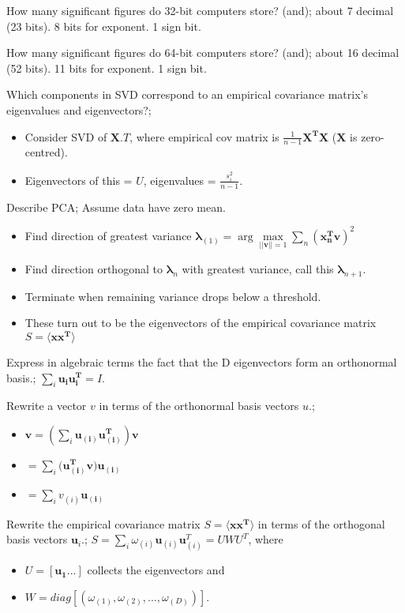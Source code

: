 \documentclass{article}
\begin{document}
How many significant figures do 32-bit computers store? (and); about 7 decimal (23 bits). 8 bits for exponent. 1 sign bit.

How many significant figures do 64-bit computers store? (and); about 16 decimal (52 bits). 11 bits for exponent. 1 sign bit.

Which components in SVD correspond to an empirical covariance matrix's eigenvalues and eigenvectors?; \begin{itemize} \item Consider SVD of $\mathbf{X}.T$, where empirical cov matrix is $\frac{1}{n-1}\mathbf{X^TX}$ ($\mathbf{X}$ is zero-centred). \item Eigenvectors of this = $U$, eigenvalues = $\frac{s_i^2}{n-1}$. \end{itemize}

Describe PCA; Assume data have zero mean. \begin{itemize} \item Find direction of greatest variance $\mathbf{\lambda}_{(1)}=\arg\max\limits_{||\mathbf{v}||=1}\sum_n(\mathbf{x^T_nv})^2$ \item Find direction orthogonal to $\mathbf{\lambda}_{n}$ with greatest variance, call this  $\mathbf{\lambda}_{n+1}$.  \item Terminate when remaining variance drops below a threshold.  \item These turn out to be the eigenvectors of the empirical covariance matrix $S=\langle \mathbf{xx^T} \rangle$ \end{itemize}

Express in algebraic terms the fact that the D eigenvectors form an orthonormal basis.; $\sum_i\mathbf{u_{i}u_{i}^T}=I$.

Rewrite a vector $v$ in terms of the orthonormal basis vectors $u$.; \begin{itemize} \item $\mathbf{v}=(\sum_i \mathbf{u_{(i)}u_{(i)}^T})\mathbf{v}$ \item $=\sum_i (\mathbf{u_{(i)}^Tv)u_{(i)}}$ \item $=\sum_i v_{(i)}\mathbf{u_{(i)}}$ \end{itemize}

Rewrite the empirical covariance matrix $S=\langle \mathbf{xx^T} \rangle$ in terms of the orthogonal basis vectors $\mathbf{u}_i$.; $S=\sum_i \omega_{(i)}\mathbf{u}_{(i)}\mathbf{u}_{(i)}^T = UWU^T$, where \begin{itemize} \item $U=[\mathbf{u_{1}}...]$ collects the eigenvectors and \item $W = diag[(\omega_{(1)}, \omega_{(2)},...,\omega_{(D)})]$.  \end{itemize}
\end{document}
